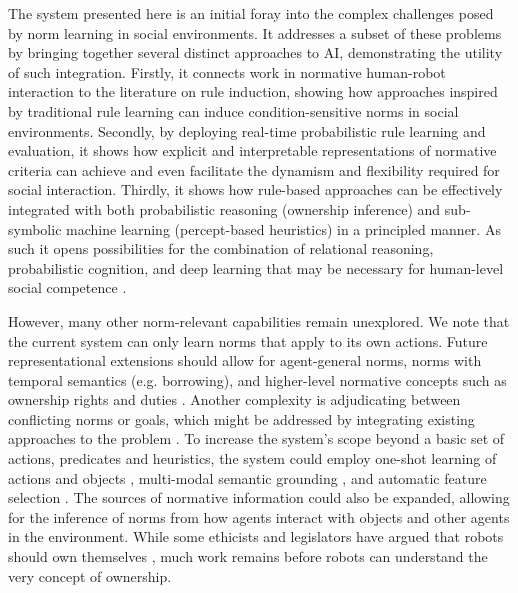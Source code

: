 \documentclass[letterpaper]{article} %
\begin{document}
The system presented here is an initial foray into the complex challenges posed by norm learning in social environments. It addresses a subset of these problems by bringing together several distinct approaches to AI, demonstrating the utility of such integration. Firstly, it connects work in normative human-robot interaction to the literature on rule induction, showing how approaches inspired by traditional rule learning can induce condition-sensitive norms in social environments. Secondly, by deploying real-time probabilistic rule learning and evaluation, it shows how explicit and interpretable representations of normative criteria can achieve and even facilitate the dynamism and flexibility required for social interaction. Thirdly, it shows how rule-based approaches can be effectively integrated with both probabilistic reasoning (ownership inference) and sub-symbolic machine learning (percept-based heuristics) in a principled manner. As such it opens possibilities for the combination of relational reasoning, probabilistic cognition, and deep learning that may be necessary for human-level social competence \cite{tenenbaum2011grow,battaglia2018relational}.

\vspace{-1.82mm}
\vspace{-1.82mm}
\vspace{-1.82mm}
However, many other norm-relevant capabilities remain unexplored. We note that the current system can only learn norms that apply to its own actions. Future representational extensions should allow for agent-general norms, norms with temporal semantics (e.g. borrowing), and higher-level normative concepts such as ownership rights and duties \cite{mccarty2002ownership}. Another complexity is adjudicating between conflicting norms or goals, which might be addressed by integrating existing approaches to the problem \cite{kasenberg2018norm,vasconcelos2009normative}. To increase the system's scope beyond a basic set of actions, predicates and heuristics, the system could employ one-shot learning of actions and objects \cite{scheutz2017spoken}, multi-modal semantic grounding \cite{thomason2016learning}, and automatic feature selection \cite{abe2010feature}. The sources of normative information could also be expanded, allowing for the inference of norms from how agents interact with objects and other agents in the environment. While some ethicists and legislators have argued that robots should own themselves \cite{turner2019legal}, much work remains before robots can understand the very concept of ownership.
\end{document}
